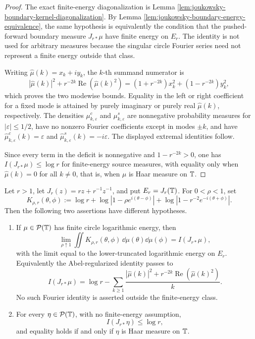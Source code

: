 \begin{proof}
The exact finite-energy diagonalization is Lemma
\ref{lem:joukowsky-boundary-kernel-diagonalization}.  By Lemma
\ref{lem:joukowsky-boundary-energy-equivalence}, the same hypothesis is
equivalently the condition that the pushed-forward boundary measure
\(J_{r\ast}\mu\) have finite energy on \(E_r\).  The identity is not used
for arbitrary measures because the singular circle Fourier series need not
represent a finite energy outside that class.

Writing \(\widehat\mu(k)=x_k+i y_k\), the \(k\)-th summand numerator is
\[
|\widehat\mu(k)|^2+r^{-2k}\operatorname{Re}(\widehat\mu(k)^2)
=(1+r^{-2k})x_k^2+(1-r^{-2k})y_k^2,
\]
which proves the two modewise bounds.  Equality in the left or right coefficient for a fixed mode is attained by purely imaginary or purely real \(\widehat\mu(k)\), respectively.  The densities \(\mu^c_{k,\varepsilon}\) and \(\mu^s_{k,\varepsilon}\) are nonnegative probability measures for \(|\varepsilon|\le1/2\), have no nonzero Fourier coefficients except in modes \(\pm k\), and have \(\widehat\mu^c_{k,\varepsilon}(k)=\varepsilon\) and \(\widehat\mu^s_{k,\varepsilon}(k)=-i\varepsilon\).  The displayed extremal identities follow.

Since every term in the deficit is nonnegative and \(1-r^{-2k}>0\), one has \(I(J_{r\ast}\mu)\le\log r\) for finite-energy source measures, with equality only when \(\widehat\mu(k)=0\) for all \(k\ne0\), that is, when \(\mu\) is Haar measure on \(\mathbb{T}\).
\end{proof}

\begin{lemma}\label{lem:abel-passage-frostman-separation}
Let \(r>1\), let \(J_r(z)=rz+r^{-1}z^{-1}\), and put
\(E_r=J_r(\mathbb{T})\).  For \(0<\rho<1\), set
\[
K_{\rho,r}(\theta,\phi)
:=\log r+\log|1-\rho e^{i(\theta-\phi)}|
  +\log|1-r^{-2}e^{-i(\theta+\phi)}|.
\]
Then the following two assertions have different hypotheses.
\begin{enumerate}[label=\textup{(\alph*)}]
  \item If \(\mu\in\mathcal P(\mathbb{T})\) has finite circle logarithmic energy, then
  \[
  \lim_{\rho\uparrow1}
  \iint K_{\rho,r}(\theta,\phi)\,\dd\mu(\theta)\dd\mu(\phi)
  =
  I(J_{r\ast}\mu),
  \]
  with the limit equal to the lower-truncated logarithmic energy on \(E_r\).  Equivalently the Abel-regularized identity passes to
  \[
  I(J_{r\ast}\mu)
  =
  \log r-\sum_{k\ge1}
  \frac{|\widehat\mu(k)|^2+r^{-2k}\operatorname{Re}(\widehat\mu(k)^2)}{k}.
  \]
  No such Fourier identity is asserted outside the finite-energy class.

  \item For every \(\eta\in\mathcal P(\mathbb{T})\), with no finite-energy assumption,
  \[
  I(J_{r\ast}\eta)\le \log r,
  \]
  and equality holds if and only if \(\eta\) is Haar measure on \(\mathbb{T}\).
\end{enumerate}
\end{lemma}

